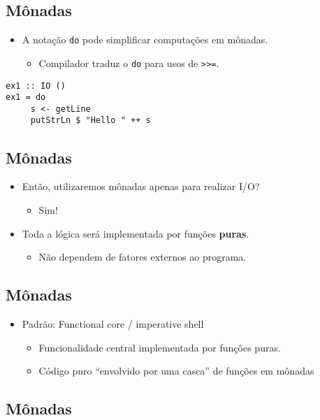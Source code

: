\documentclass[11pt]{article}
\begin{document}
\subsection*{Mônadas}
\label{sec:org47ae72e}

\begin{itemize}
\item A notação \texttt{do} pode simplificar computações em mônadas.
\begin{itemize}
\item Compilador traduz o \texttt{do} para usos de \texttt{>{}>{}=}.
\end{itemize}
\end{itemize}

\begin{verbatim}
ex1 :: IO ()
ex1 = do
     s <- getLine
     putStrLn $ "Hello " ++ s
\end{verbatim}
\subsection*{Mônadas}
\label{sec:orga600002}

\begin{itemize}
\item Então, utilizaremos mônadas apenas para realizar I/O?
\begin{itemize}
\item Sim!
\end{itemize}
\item Toda a lógica será implementada por funções \textbf{puras}.
\begin{itemize}
\item Não dependem de fatores externos ao programa.
\end{itemize}
\end{itemize}
\subsection*{Mônadas}
\label{sec:org2f62bdf}

\begin{itemize}
\item Padrão: Functional core / imperative shell
\begin{itemize}
\item Funcionalidade central implementada por funções puras.
\item Código puro ``envolvido por uma casca'' de funções em mônadas
\end{itemize}
\end{itemize}
\subsection*{Mônadas}
\label{sec:org7b5146b}
\end{document}
